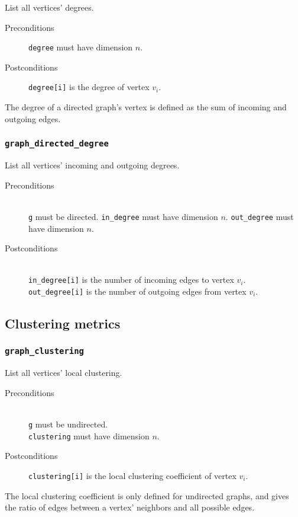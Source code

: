 List all vertices' degrees.

\begin{description}
 \item[Preconditions] \texttt{degree} must have dimension $n$.
 \item[Postconditions] \texttt{degree[i]} is the degree of vertex $v_i$.
\end{description}

The degree of a directed graph's vertex is defined as the sum of incoming
and outgoing edges.

\subsubsection{\texttt{graph\_directed\_degree}}

List all vertices' incoming and outgoing degrees.

\begin{description}
 \item[Preconditions] ~\\
   \texttt{g} must be directed.
   \texttt{in\_degree} must have dimension $n$.
   \texttt{out\_degree} must have dimension $n$.
 \item[Postconditions] ~\\
   \texttt{in\_degree[i]} is the number of incoming edges to vertex $v_i$.
   \texttt{out\_degree[i]} is the number of outgoing edges from vertex $v_i$.
\end{description}

\subsection{Clustering metrics}
\subsubsection{\texttt{graph\_clustering}}
List all vertices' local clustering.

\begin{description}
 \item[Preconditions] ~\\
   \texttt{g} must be undirected. \\
   \texttt{clustering} must have dimension $n$.
 \item[Postconditions] \texttt{clustering[i]} is the local clustering coefficient
  of vertex $v_i$.
\end{description}


The local clustering coefficient is only defined for undirected graphs, and
gives the ratio of edges between a vertex' neighbors and all possible edges.

